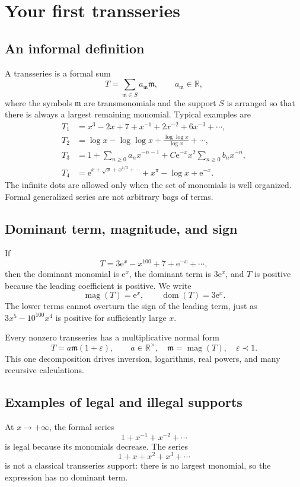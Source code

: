 \documentclass[11pt,openany]{book}
\theoremstyle{plain}
\theoremstyle{definition}
\theoremstyle{remark}
\newcommand{\R}{\mathbb{R}}
\newcommand{\m}{\mathfrak{m}}
\newcommand{\magop}{\operatorname{mag}}
\newcommand{\domop}{\operatorname{dom}}
\newcommand{\e}{\mathrm{e}}
\begin{document}
\chapter{Your first transseries}

\section{An informal definition}
A transseries is a formal sum
\[
  T=\sum_{\m\in S} a_{\m}\m,
  \qquad a_{\m}\in\R,
\]
where the symbols $\m$ are transmonomials and the support $S$ is arranged so that there is always a largest remaining monomial. Typical examples are
\begin{align*}
  T_1&=x^3-2x+7+x^{-1}+2x^{-2}+6x^{-3}+\cdots,\\
  T_2&=\log x-\log\log x+\frac{\log\log x}{\log x}+\cdots,\\
  T_3&=1+\sum_{n\ge0}a_nx^{-n-1}
      +C\e^{-x}x^2\sum_{n\ge0}b_nx^{-n},\\
  T_4&=\e^{x+\sqrt{x}+x^{1/3}+\cdots}+x^\pi-\log x+\e^{-x}.
\end{align*}
The infinite dots are allowed only when the set of monomials is well organized. Formal generalized series are not arbitrary bags of terms.

\section{Dominant term, magnitude, and sign}
If
\[
  T=3\e^x-x^{100}+7+\e^{-x}+\cdots,
\]
then the dominant monomial is $\e^x$, the dominant term is $3\e^x$, and $T$ is positive because the leading coefficient is positive. We write
\[
  \magop(T)=\e^x,
  \qquad
  \domop(T)=3\e^x.
\]
The lower terms cannot overturn the sign of the leading term, just as $3x^5-10^{100}x^4$ is positive for sufficiently large $x$.

Every nonzero transseries has a multiplicative normal form
\[
  T=a\m(1+\varepsilon),
  \qquad a\in\R^\times,
  \quad \m=\magop(T),
  \quad \varepsilon\prec1.
\]
This one decomposition drives inversion, logarithms, real powers, and many recursive calculations.

\section{Examples of legal and illegal supports}
At $x\to+\infty$, the formal series
\[
  1+x^{-1}+x^{-2}+\cdots
\]
is legal because its monomials decrease. The series
\[
  1+x+x^2+x^3+\cdots
\]
is not a classical transseries support: there is no largest monomial, so the expression has no dominant term.
\end{document}
